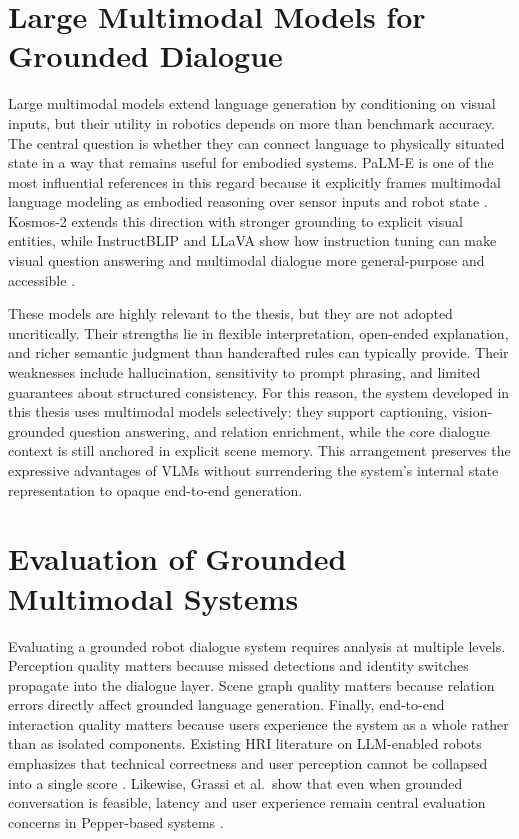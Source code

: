 \documentclass[
  digital,     %
  oneside,     %
  nosansbold,  %
  nocolorbold, %
  lof,         %
  lot,         %
]{fithesis4}
\begin{document}
\section{Large Multimodal Models for Grounded Dialogue}
Large multimodal models extend language generation by conditioning on visual inputs, but their utility in robotics depends on more than benchmark accuracy. The central question is whether they can connect language to physically situated state in a way that remains useful for embodied systems. PaLM-E is one of the most influential references in this regard because it explicitly frames multimodal language modeling as embodied reasoning over sensor inputs and robot state \cite{driess_palm-e_2023}. Kosmos-2 extends this direction with stronger grounding to explicit visual entities, while InstructBLIP and LLaVA show how instruction tuning can make visual question answering and multimodal dialogue more general-purpose and accessible \cite{peng_kosmos-2_2023, dai_instructblip_2023, liu_visual_2023}.

These models are highly relevant to the thesis, but they are not adopted uncritically. Their strengths lie in flexible interpretation, open-ended explanation, and richer semantic judgment than handcrafted rules can typically provide. Their weaknesses include hallucination, sensitivity to prompt phrasing, and limited guarantees about structured consistency. For this reason, the system developed in this thesis uses multimodal models selectively: they support captioning, vision-grounded question answering, and relation enrichment, while the core dialogue context is still anchored in explicit scene memory. This arrangement preserves the expressive advantages of VLMs without surrendering the system's internal state representation to opaque end-to-end generation.

\section{Evaluation of Grounded Multimodal Systems}
Evaluating a grounded robot dialogue system requires analysis at multiple levels. Perception quality matters because missed detections and identity switches propagate into the dialogue layer. Scene graph quality matters because relation errors directly affect grounded language generation. Finally, end-to-end interaction quality matters because users experience the system as a whole rather than as isolated components. Existing HRI literature on LLM-enabled robots emphasizes that technical correctness and user perception cannot be collapsed into a single score \cite{kim_understanding_2024}. Likewise, Grassi et al.\ show that even when grounded conversation is feasible, latency and user experience remain central evaluation concerns in Pepper-based systems \cite{grassi_grounding_2024}.
\end{document}

